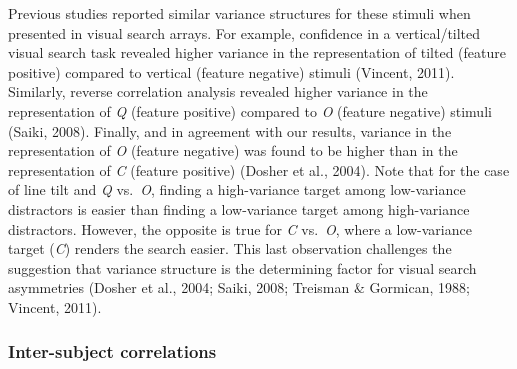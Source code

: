 \documentclass[12pt,twoside]{reedthesis}
\begin{document}
Previous studies reported similar variance structures for these stimuli when presented in visual search arrays. For example, confidence in a vertical/tilted visual search task revealed higher variance in the representation of tilted (feature positive) compared to vertical (feature negative) stimuli (Vincent, 2011). Similarly, reverse correlation analysis revealed higher variance in the representation of \emph{Q} (feature positive) compared to \emph{O} (feature negative) stimuli (Saiki, 2008). Finally, and in agreement with our results, variance in the representation of \emph{O} (feature negative) was found to be higher than in the representation of \emph{C} (feature positive) (Dosher et al., 2004). Note that for the case of line tilt and \emph{Q} vs.~\emph{O}, finding a high-variance target among low-variance distractors is easier than finding a low-variance target among high-variance distractors. However, the opposite is true for \emph{C} vs.~\emph{O}, where a low-variance target (\emph{C}) renders the search easier. This last observation challenges the suggestion that variance structure is the determining factor for visual search asymmetries (Dosher et al., 2004; Saiki, 2008; Treisman \& Gormican, 1988; Vincent, 2011).

\hypertarget{inter-subject-correlations}{%
\subsubsection*{Inter-subject correlations}\label{inter-subject-correlations}}
\end{document}
